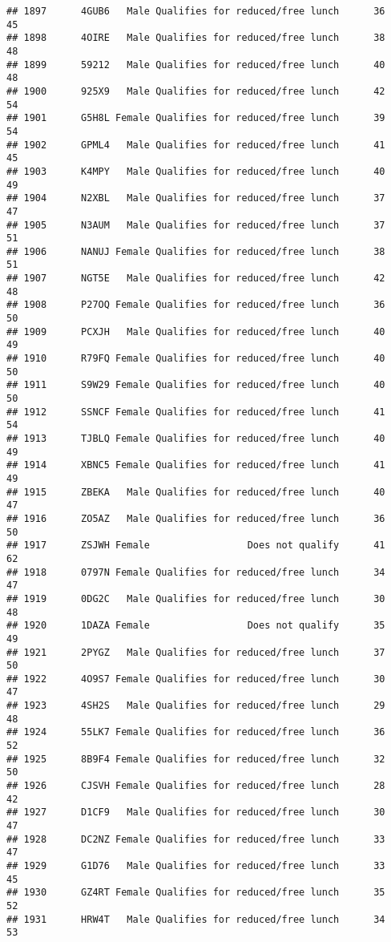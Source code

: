 \documentclass[
]{article}
\begin{document}
\begin{verbatim}
## 1897      4GUB6   Male Qualifies for reduced/free lunch      36       45
## 1898      4OIRE   Male Qualifies for reduced/free lunch      38       48
## 1899      59212   Male Qualifies for reduced/free lunch      40       48
## 1900      925X9   Male Qualifies for reduced/free lunch      42       54
## 1901      G5H8L Female Qualifies for reduced/free lunch      39       54
## 1902      GPML4   Male Qualifies for reduced/free lunch      41       45
## 1903      K4MPY   Male Qualifies for reduced/free lunch      40       49
## 1904      N2XBL   Male Qualifies for reduced/free lunch      37       47
## 1905      N3AUM   Male Qualifies for reduced/free lunch      37       51
## 1906      NANUJ Female Qualifies for reduced/free lunch      38       51
## 1907      NGT5E   Male Qualifies for reduced/free lunch      42       48
## 1908      P27OQ Female Qualifies for reduced/free lunch      36       50
## 1909      PCXJH   Male Qualifies for reduced/free lunch      40       49
## 1910      R79FQ Female Qualifies for reduced/free lunch      40       50
## 1911      S9W29 Female Qualifies for reduced/free lunch      40       50
## 1912      SSNCF Female Qualifies for reduced/free lunch      41       54
## 1913      TJBLQ Female Qualifies for reduced/free lunch      40       49
## 1914      XBNC5 Female Qualifies for reduced/free lunch      41       49
## 1915      ZBEKA   Male Qualifies for reduced/free lunch      40       47
## 1916      ZO5AZ   Male Qualifies for reduced/free lunch      36       50
## 1917      ZSJWH Female                 Does not qualify      41       62
## 1918      0797N Female Qualifies for reduced/free lunch      34       47
## 1919      0DG2C   Male Qualifies for reduced/free lunch      30       48
## 1920      1DAZA Female                 Does not qualify      35       49
## 1921      2PYGZ   Male Qualifies for reduced/free lunch      37       50
## 1922      4O9S7 Female Qualifies for reduced/free lunch      30       47
## 1923      4SH2S   Male Qualifies for reduced/free lunch      29       48
## 1924      55LK7 Female Qualifies for reduced/free lunch      36       52
## 1925      8B9F4 Female Qualifies for reduced/free lunch      32       50
## 1926      CJSVH Female Qualifies for reduced/free lunch      28       42
## 1927      D1CF9   Male Qualifies for reduced/free lunch      30       47
## 1928      DC2NZ Female Qualifies for reduced/free lunch      33       47
## 1929      G1D76   Male Qualifies for reduced/free lunch      33       45
## 1930      GZ4RT Female Qualifies for reduced/free lunch      35       52
## 1931      HRW4T   Male Qualifies for reduced/free lunch      34       53

\end{verbatim}
\end{document}
